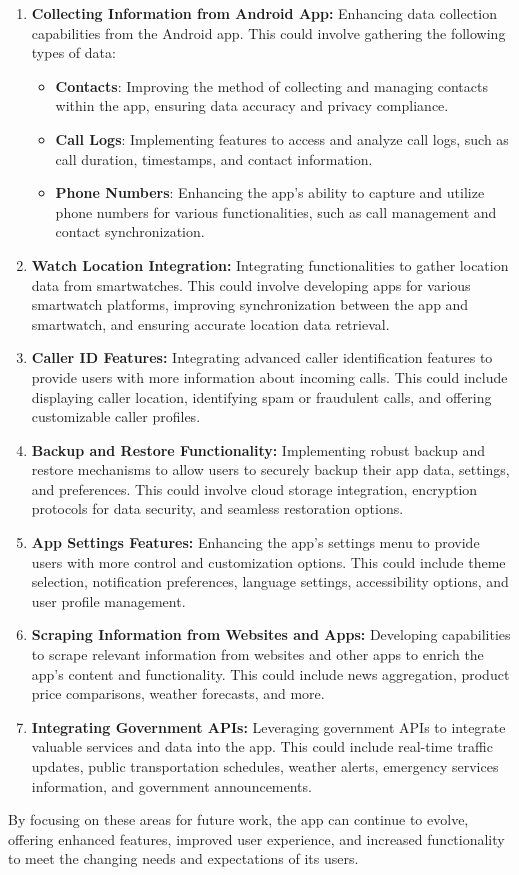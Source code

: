 \begin{enumerate}[label=\arabic*.]

    \item \textbf{Collecting Information from Android App:} Enhancing data collection capabilities from the Android app. This could involve gathering the following types of data:
    \begin{itemize}
        \item \textbf{Contacts}: Improving the method of collecting and managing contacts within the app, ensuring data accuracy and privacy compliance.
        \item \textbf{Call Logs}: Implementing features to access and analyze call logs, such as call duration, timestamps, and contact information.
        \item \textbf{Phone Numbers}: Enhancing the app's ability to capture and utilize phone numbers for various functionalities, such as call management and contact synchronization.
    \end{itemize}
    
    \item \textbf{Watch Location Integration:} Integrating functionalities to gather location data from smartwatches. This could involve developing apps for various smartwatch platforms, improving synchronization between the app and smartwatch, and ensuring accurate location data retrieval.

    \item \textbf{Caller ID Features:} Integrating advanced caller identification features to provide users with more information about incoming calls. This could include displaying caller location, identifying spam or fraudulent calls, and offering customizable caller profiles.
    
    \item \textbf{Backup and Restore Functionality:} Implementing robust backup and restore mechanisms to allow users to securely backup their app data, settings, and preferences. This could involve cloud storage integration, encryption protocols for data security, and seamless restoration options.
    
    \item \textbf{App Settings Features:} Enhancing the app's settings menu to provide users with more control and customization options. This could include theme selection, notification preferences, language settings, accessibility options, and user profile management.
    
    \item \textbf{Scraping Information from Websites and Apps:} Developing capabilities to scrape relevant information from websites and other apps to enrich the app's content and functionality. This could include news aggregation, product price comparisons, weather forecasts, and more.
    
    \item \textbf{Integrating Government APIs:} Leveraging government APIs to integrate valuable services and data into the app. This could include real-time traffic updates, public transportation schedules, weather alerts, emergency services information, and government announcements.
\end{enumerate}

By focusing on these areas for future work, the \textbf{{{\myprojectname}}} app can continue to evolve, offering enhanced features, improved user experience, and increased functionality to meet the changing needs and expectations of its users.
